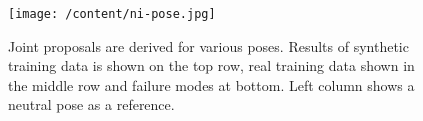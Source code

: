 \begin{figure}
	[h]
	\texttt{[image: /content/ni-pose.jpg]} \caption{Joint proposals are derived for various poses. Results of synthetic training data is shown on the top row, real training data shown in the middle row and failure modes at bottom. Left column shows a neutral pose as a reference. \cite{13} } \label{fg:ni:pose} 
\end{figure}
